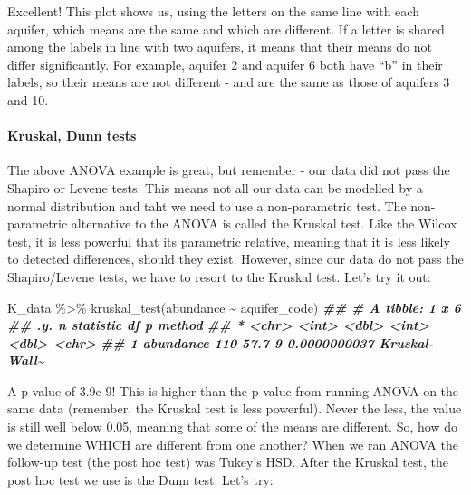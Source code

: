 \documentclass[
]{krantz}
\newenvironment{Shaded}{\begin{snugshade}}{\end{snugshade}}
\newcommand{\DocumentationTok}[1]{\textcolor[rgb]{0.56,0.35,0.01}{\textbf{\textit{#1}}}}
\newcommand{\FunctionTok}[1]{\textcolor[rgb]{0.00,0.00,0.00}{#1}}
\newcommand{\NormalTok}[1]{#1}
\newcommand{\SpecialCharTok}[1]{\textcolor[rgb]{0.00,0.00,0.00}{#1}}
\begin{document}
Excellent! This plot shows us, using the letters on the same line with each aquifer, which means are the same and which are different. If a letter is shared among the labels in line with two aquifers, it means that their means do not differ significantly. For example, aquifer 2 and aquifer 6 both have ``b'' in their labels, so their means are not different - and are the same as those of aquifers 3 and 10.

\hypertarget{kruskal-dunn-tests}{%
\paragraph{Kruskal, Dunn tests}\label{kruskal-dunn-tests}}

The above ANOVA example is great, but remember - our data did not pass the Shapiro or Levene tests. This means not all our data can be modelled by a normal distribution and taht we need to use a non-parametric test. The non-parametric alternative to the ANOVA is called the Kruskal test. Like the Wilcox test, it is less powerful that its parametric relative, meaning that it is less likely to detected differences, should they exist. However, since our data do not pass the Shapiro/Levene tests, we have to resort to the Kruskal test. Let's try it out:

\begin{Shaded}
\begin{Highlighting}[]
\NormalTok{K\_data }\SpecialCharTok{\%\textgreater{}\%}
  \FunctionTok{kruskal\_test}\NormalTok{(abundance }\SpecialCharTok{\textasciitilde{}}\NormalTok{ aquifer\_code)}
\DocumentationTok{\#\# \# A tibble: 1 x 6}
\DocumentationTok{\#\#   .y.           n statistic    df            p method       }
\DocumentationTok{\#\# * \textless{}chr\textgreater{}     \textless{}int\textgreater{}     \textless{}dbl\textgreater{} \textless{}int\textgreater{}        \textless{}dbl\textgreater{} \textless{}chr\textgreater{}        }
\DocumentationTok{\#\# 1 abundance   110      57.7     9 0.0000000037 Kruskal{-}Wall\textasciitilde{}}
\end{Highlighting}
\end{Shaded}

A p-value of 3.9e-9! This is higher than the p-value from running ANOVA on the same data (remember, the Kruskal test is less powerful). Never the less, the value is still well below 0.05, meaning that some of the means are different. So, how do we determine WHICH are different from one another? When we ran ANOVA the follow-up test (the post hoc test) was Tukey's HSD. After the Kruskal test, the post hoc test we use is the Dunn test. Let's try:
\end{document}

